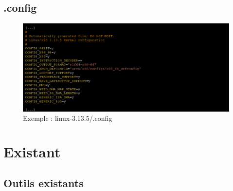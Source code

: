 \documentclass[11pt]{beamer}
\begin{document}
\subsection{.config}
\begin{frame}[fragile]
    \begin{figure}
        \caption{Exemple : linux-3.13.5/.config}
        \includegraphics[scale=0.35]{ex_config.png}
        \centering
    \end{figure}
\end{frame}

\section{Existant}
\subsection{Outils existants}
\end{document}
